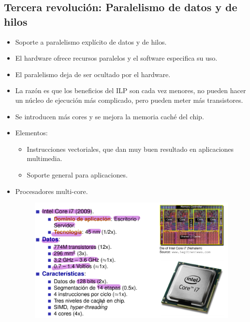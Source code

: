 \documentclass[12pt, twoside, openright]{report} %
\begin{document}
    \subsection{Tercera revolución: Paralelismo de datos y de hilos}

    \begin{itemize}
    \item
      Soporte a paralelismo explícito de datos y de hilos.
    \item
      El hardware ofrece recursos paralelos y el software especifica su
      uso.
    \item
      El paralelismo deja de ser ocultado por el hardware.
    \item
      La razón es que los beneficios del ILP son cada vez menores, no
      pueden hacer un núcleo de ejecución más complicado, pero pueden
      meter más transistores.
    \item
      Se introducen más cores y se mejora la memoria caché del chip.
    \item
      Elementos:

      \begin{itemize}
      
      \item
        Instrucciones vectoriales, que dan muy buen resultado en
        aplicaciones multimedia.
      \item
        Soporte general para aplicaciones.
      \end{itemize}
    \pagebreak
    \item Procesadores multi-core.
      \begin{figure}[H]
        {\includegraphics[scale=.25]{Untitled 4.png}}
      \end{figure}
    \end{itemize}
\end{document}
